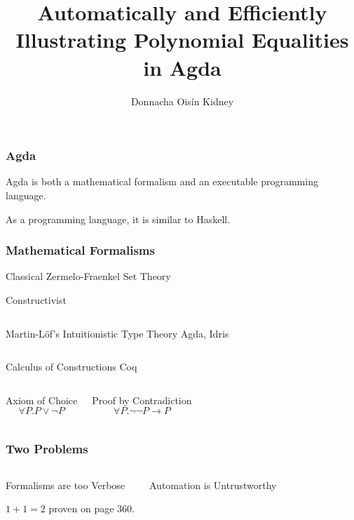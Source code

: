 \documentclass[usenames,dvipsnames]{beamer}
\title{Automatically and Efficiently Illustrating Polynomial Equalities in Agda}
\author{Donnacha Oisín Kidney}
\begin{document}

\maketitle
\begin{frame}
  \frametitle{Agda}
  Agda is both a mathematical formalism and an executable programming language.

  As a programming language, it is similar to Haskell.



\end{frame}
\begin{frame}
  \frametitle{Mathematical Formalisms}
  \begin{block}{Classical}
    Zermelo-Fraenkel Set Theory
  \end{block}

  \begin{block}{Constructivist}
    \medskip

    \begin{columns}
      Martin-Löf's Intuitionistic Type Theory
      Agda, Idris
    \end{columns}

    \bigskip

    \begin{columns}
      Calculus of Constructions
      Coq
    \end{columns}
  \end{block}


  \begin{columns}[T,onlytextwidth]
    \begin{alertblock}{Axiom of Choice}
      \[\forall P. P \vee \neg P\]
    \end{alertblock}
    \begin{alertblock}{Proof by Contradiction}
      \[\forall P. \neg \neg P \rightarrow P\]
    \end{alertblock}
  \end{columns}
\end{frame}
\begin{frame}
  \frametitle{Two Problems}
  \begin{columns}
    \begin{block}{Formalisms are too Verbose}

      \(1+1=2\) proven on page 360.
    \end{block}
    \begin{block}{Automation is Untrustworthy}
    \end{block}
  \end{columns}
\end{frame}
\end{document}
